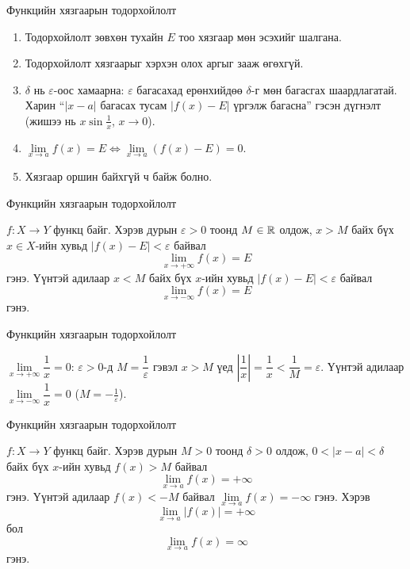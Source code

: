 \begin{frame}[allowframebreaks]{Функцийн хязгаарын тодорхойлолт}
\begin{remark}
\begin{enumerate}
\item Тодорхойлолт зөвхөн тухайн $E$ тоо хязгаар мөн эсэхийг шалгана.
\item Тодорхойлолт хязгаарыг хэрхэн олох аргыг зааж өгөхгүй.
\item $\delta$ нь $\varepsilon$-оос хамаарна: $\varepsilon$ багасахад ерөнхийдөө $\delta$-г мөн багасгах шаардлагатай.
      Харин ``$|x-a|$ багасах тусам $|f(x)-E|$ үргэлж багасна'' гэсэн дүгнэлт 
      (жишээ нь $x\sin\frac1x$, $x\to0$).
\item $\lim\limits_{x\to a}f(x)=E \iff \lim\limits_{x\to a}(f(x)-E)=0$.
\item Хязгаар оршин байхгүй ч байж болно.
\end{enumerate}
\end{remark}
\end{frame}

\begin{frame}[allowframebreaks]{Функцийн хязгаарын тодорхойлолт}
\begin{definition}
$f:X\to Y$ функц байг. Хэрэв дурын $\varepsilon>0$ тоонд $M\in\mathbb{R}$ олдож, $x>M$ байх бүх $x\in X$-ийн хувьд $|f(x)-E|<\varepsilon$ байвал
\[
\lim_{x \to +\infty} f(x) = E
\]
гэнэ. Үүнтэй адилаар $x<M$ байх бүх $x$-ийн хувьд $|f(x)-E|<\varepsilon$ байвал
\[
\lim_{x \to -\infty} f(x) = E
\]
гэнэ.
\end{definition}
\end{frame}

\begin{frame}[allowframebreaks]{Функцийн хязгаарын тодорхойлолт}
\begin{example}
$\lim\limits_{x\to +\infty}\dfrac{1}{x}=0$: $\varepsilon>0$-д $M=\dfrac1\varepsilon$ гэвэл $x>M$ үед
$\left|\dfrac1x\right|=\dfrac1x<\dfrac1M=\varepsilon$. Үүнтэй адилаар $\lim\limits_{x\to -\infty}\dfrac{1}{x}=0$ ($M=-\frac1\varepsilon$).
\end{example}
\end{frame}

\begin{frame}[allowframebreaks]{Функцийн хязгаарын тодорхойлолт}
\begin{definition}
$f:X\to Y$ функц байг. Хэрэв дурын $M>0$ тоонд $\delta>0$ олдож, $0<|x-a|<\delta$ байх бүх $x$-ийн хувьд $f(x)>M$ байвал
\[
\lim_{x \to a} f(x) = +\infty
\]
гэнэ. Үүнтэй адилаар $f(x)<-M$ байвал $\lim\limits_{x \to a} f(x) = -\infty$ гэнэ. Хэрэв
\[
\lim_{x \to a} |f(x)| = +\infty
\]
бол
\[
\lim_{x \to a} f(x) = \infty
\]
гэнэ.
\end{definition}
\end{frame}

